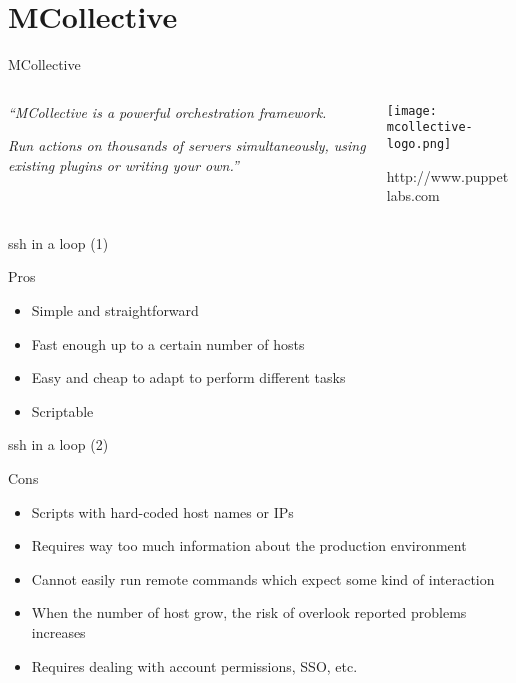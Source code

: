 \documentclass[presentation]{beamer}
\begin{document}
\section{MCollective}
\label{sec-7}

\begin{frame}[label=sec-7-1]{MCollective}
\begin{columns}
\begin{column}{0.6\textwidth}

\textit{``MCollective is a powerful orchestration framework.}

\textit{Run actions on thousands of servers simultaneously, using existing plugins or writing your own.''}
\end{column}

\begin{column}{0.4\textwidth}

\texttt{[image: mcollective-logo.png]}

\small{http://www.puppetlabs.com}
\end{column}
\end{columns}
\end{frame}


\begin{frame}[label=sec-7-2]{ssh in a loop (1)}
\begin{block}{Pros}

\begin{itemize}
\item Simple and straightforward
\item Fast enough up to a certain number of hosts
\item Easy and cheap to adapt to perform different tasks
\item Scriptable
\end{itemize}
\end{block}
\end{frame}

\begin{frame}[label=sec-7-3]{ssh in a loop (2)}
\begin{block}{Cons}

\begin{itemize}
\item Scripts with hard-coded host names or IPs
\item Requires way too much information about the production environment
\item Cannot easily run remote commands which expect some kind of interaction
\item When the number of host grow, the risk of overlook reported problems increases
\item Requires dealing with account permissions, SSO, etc.
\end{itemize}
\end{block}
\end{frame}
\end{document}
